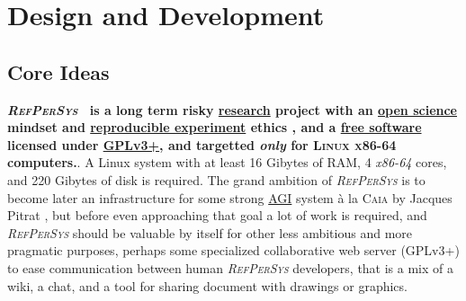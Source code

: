 \documentclass{IEEEtran}
\newcommand{\RefPerSys}{{\textit{\textsc{RefPerSys}}}}
\begin{document}
%




\section{Design and Development}
\label{sec:design-dev}

\subsection{Core Ideas}
\label{subsec:core-ideas}
\textbf{\RefPerSys~ is a long term risky
  \href{https://en.wikipedia.org/wiki/Research}{research} project with
  an \href{https://en.wikipedia.org/wiki/Open_science}{open science}
  mindset and
  \href{https://ropensci.github.io/reproducibility-guide/sections/introduction/}{reproducible
    experiment} ethics \cite{zuboff:2015:big-other,
    oneil:2016:weapons}, and a
  \href{https://www.gnu.org/philosophy/free-sw.en.html}{free software}
  licensed under
  \href{https://www.gnu.org/licenses/gpl-3.0.html}{GPLv3+}, and
  targetted \emph{only} for \textsc{Linux x86-64} computers.}. A Linux
system with at least 16 Gibytes of RAM, 4 \textit{x86-64} cores, and
220 Gibytes of disk is required. The grand ambition of {\RefPerSys} is
to become later an infrastructure for some strong
\href{https://en.wikipedia.org/wiki/Artificial_general_intelligence}{AGI}
system à la \textsc{Caia} by Jacques
Pitrat \cite{Pitrat:1996:FGCS, Pitrat:2009:AST,
  Pitrat:2009:ArtifBeings}, but before even approaching that goal a
lot of work is required, and {\RefPerSys} should be valuable by
itself for other less ambitious and more pragmatic purposes, perhaps
some specialized collaborative web server (GPLv3+) to ease
communication between human {\RefPerSys} developers, that is a mix of
a wiki, a chat, and a tool for sharing document with drawings or
graphics.
\end{document}
